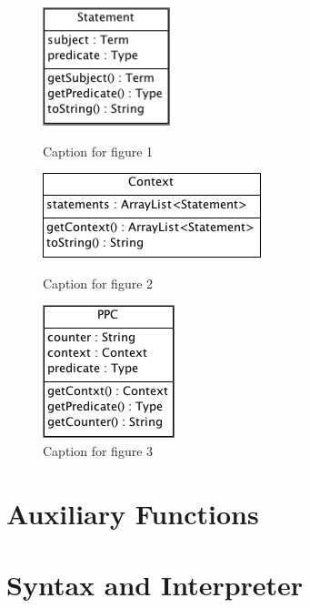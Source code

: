 \begin{figure}
\centering
\begin{minipage}{.3\textwidth}
\centering
\includegraphics[scale=0.8]{pics/Statement}
\caption{Caption for figure 1}
\label{fig:test1}
\end{minipage}\hfill
\begin{minipage}{.3\textwidth}
\centering
\includegraphics[scale=0.65]{pics/Context}
\caption{Caption for figure 2}
\label{fig:test2}
\end{minipage}\hfill
\begin{minipage}{.3\textwidth}
\centering
\includegraphics[scale=0.7]{pics/PPC}
\caption{Caption for figure 3}
\label{fig:test3}
\end{minipage}
\end{figure}


\section{Auxiliary Functions}

\section{Syntax and Interpreter}